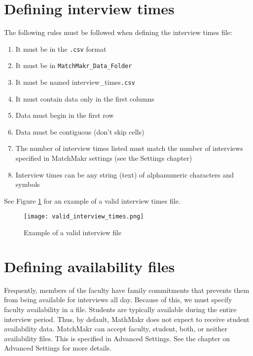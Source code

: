 %
%
\section{Defining interview times}

The following rules must be followed when defining the interview times file:
\begin{enumerate}
	\item It must be in the \texttt{.csv} format
	\item It must be in \texttt{MatchMakr\_Data\_Folder}
	\item It must be named interview\_times\texttt{.csv}
	\item It must contain data only in the first columns
	\item Data must begin in the first row
	\item Data must be contiguous (don't skip cells)
	\item The number of interview times listed must match the number of interviews specified in MatchMakr settings (see the Settings chapter)
	\item Interview times can be any string (text) of alphanumeric characters and symbols
\end{enumerate}

See Figure \ref{fig:valid_interview_times} for an example of a valid interview times file.

\begin{figure}
	\centering
	\texttt{[image: valid\_interview\_times.png]}
	\caption{\label{fig:valid_interview_times} Example of a valid interview file}
\end{figure}



%
%
\section{Defining availability files}

Frequently, members of the faculty have family commitments that prevents them from being available for interviews all day.  Because of this, we must specify faculty availability in a file.  Students are typically available during the entire interview period.  Thus, by default, MathMakr does not expect to receive student availability data.  MatchMakr can accept faculty, student, both, or neither availability files.  This is specified in Advanced Settings.  See the chapter on Advanced Settings for more details.

